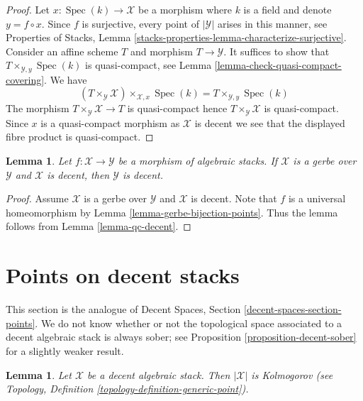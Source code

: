\documentclass{stacks-project}
\theoremstyle{plain}
\newtheorem{lemma}[subsection]{Lemma}
\theoremstyle{definition}
\theoremstyle{remark}
\numberwithin{equation}{subsection}
\def\Spec{\mathop{\mathrm{Spec}}}
\begin{document}
\begin{proof}
Let $x : \Spec(k) \to \mathcal{X}$ be a morphism where $k$ is a field
and denote $y = f \circ x$. Since $f$ is surjective, every point
of $|\mathcal{Y}|$ arises in this manner, see Properties of Stacks,
Lemma \ref{stacks-properties-lemma-characterize-surjective}.
Consider an affine scheme $T$ and morphism
$T \to \mathcal{Y}$. It suffices to show that
$T \times_{\mathcal{Y}, y} \Spec(k)$ is quasi-compact, see
Lemma \ref{lemma-check-quasi-compact-covering}.
We have
$$
(T \times_{\mathcal{Y}} \mathcal{X}) \times_{\mathcal{X}, x} \Spec(k) =
T \times_{\mathcal{Y}, y} \Spec(k)
$$
The morphism $T \times_{\mathcal{Y}} \mathcal{X} \to T$ is quasi-compact
hence $T \times_\mathcal{Y} \mathcal{X}$ is quasi-compact. Since $x$ is
a quasi-compact morphism as $\mathcal{X}$ is decent
we see that the displayed fibre product is quasi-compact.
\end{proof}

\begin{lemma}
\label{lemma-gerbe-decent}
Let $f : \mathcal{X} \to \mathcal{Y}$ be a morphism of algebraic stacks.
If $\mathcal{X}$ is a gerbe over $\mathcal{Y}$ and $\mathcal{X}$ is decent,
then $\mathcal{Y}$ is decent.
\end{lemma}

\begin{proof}
Assume $\mathcal{X}$ is a gerbe over $\mathcal{Y}$ and $\mathcal{X}$ is decent.
Note that $f$ is a universal homeomorphism by
Lemma \ref{lemma-gerbe-bijection-points}.
Thus the lemma follows from Lemma \ref{lemma-qc-decent}.
\end{proof}



\section{Points on decent stacks}
\label{section-points-decent}

\noindent
This section is the analogue of Decent Spaces, Section
\ref{decent-spaces-section-points}.
We do not know whether or not the topological space associated
to a decent algebraic stack is always sober; see
Proposition \ref{proposition-decent-sober} for a slightly weaker result.

\begin{lemma}
\label{lemma-kolmogorov}
Let $\mathcal{X}$ be a decent algebraic stack.
Then $|\mathcal{X}|$ is Kolmogorov (see
Topology, Definition \ref{topology-definition-generic-point}).
\end{lemma}
\end{document}
